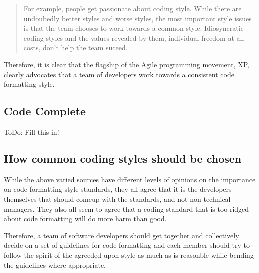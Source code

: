 \begin{quote}

For example, people get passionate about coding style.  While there are
undoubedly better styles and worse styles, the most important style issues is
that the team chooses to work towards a common style.  Idiosyncratic coding
styles and the values revealed by them, individual freedom at all costs, don't
help the team suceed.

\end{quote}

Therefore, it is clear that the flagship of the Agile programming movement,
XP, clearly advocates that a team of developers work towards a consistent code
formatting style.

%
\subsection{Code Complete}
%

ToDo: Fill this in!

%
\subsection{How common coding styles should be chosen}
%

While the above varied sources have different levels of opinions on the
importance on code formatting style standards, they all agree that it is the
developers themselves that should comeup with the standards, and not
non-technical managers.  They also all seem to agree that a coding standard
that is too ridged about code formatting will do more harm than good.

Therefore, a team of software developers should get together and collectively
decide on a set of guidelines for code formatting and each member should try
to follow the spirit of the agreeded upon style as much as is reasonble while
bending the guidelines where appropriate.
